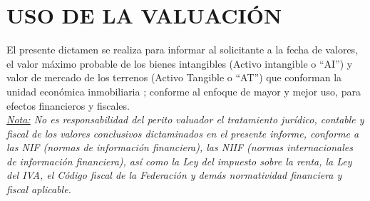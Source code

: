 \section{USO DE LA VALUACI\'ON}\label{uso}\label{sec:i}
El presente dictamen se realiza para informar al solicitante a la fecha de valores, el valor m\'aximo probable de los bienes intangibles (Activo intangible o ``AI'') y valor de mercado de los terrenos (Activo Tangible o ``AT'') que conforman la unidad econ\'omica inmobiliaria \textcolor{principal}{\empresaCorto}; conforme al enfoque de mayor y mejor uso, para efectos financieros y fiscales.\\


\textit{\underline{Nota:} No es responsabilidad del perito valuador el tratamiento jur\'idico, contable y fiscal de los valores conclusivos dictaminados en el presente informe, conforme a las NIF (normas de informaci\'on financiera), las NIIF (normas internacionales de informaci\'on financiera), as\'i como la Ley del impuesto sobre la renta, la Ley del IVA, el C\'odigo fiscal de la Federaci\'on y dem\'as normatividad financiera y fiscal aplicable.}
